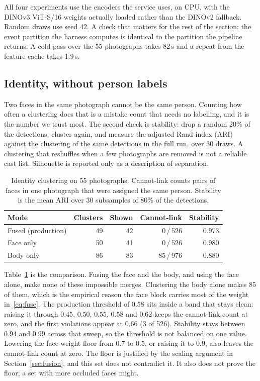 \documentclass[conference]{IEEEtran}
\begin{document}
All four experiments use the encoders the service uses, on CPU, with the
\mbox{DINOv3} ViT-S/16 weights actually loaded rather than the DINOv2 fallback.
Random draws use seed 42. A check that matters for the rest of the section:
the event partition the harness computes is identical to the partition the
pipeline returns. A cold pass over the 55 photographs takes 82\,s and a repeat
from the feature cache takes 1.9\,s.

\subsection{Identity, without person labels}
\label{sec:id-eval}

Two faces in the same photograph cannot be the same person. Counting how often
a clustering does that is a mistake count that needs no labelling, and it is
the number we trust most. The second check is stability: drop a random 20\% of
the detections, cluster again, and measure the adjusted Rand index
(ARI)~\cite{hubert1985comparing} against the clustering of the same detections
in the full run, over 30 draws. A clustering that reshuffles when a few
photographs are removed is not a reliable cast list. Silhouette is reported
only as a description of separation.

\begin{table}[t]
\caption{Identity clustering on 55 photographs. Cannot-link counts pairs of
faces in one photograph that were assigned the same person. Stability is the
mean ARI over 30 subsamples of 80\% of the detections.}
\label{tab:identity}
\centering
\scriptsize
\begin{tabular}{@{}lrrrr@{}}
\toprule
Mode & Clusters & Shown & Cannot-link & Stability \\
\midrule
Fused (production) & 49 & 42 & 0\,/\,526 & 0.973 \\
Face only & 50 & 41 & 0\,/\,526 & 0.980 \\
Body only & 86 & 83 & 85\,/\,976 & 0.880 \\
\bottomrule
\end{tabular}
\end{table}

Table~\ref{tab:identity} is the comparison. Fusing the face and the body, and
using the face alone, make none of these impossible merges. Clustering the
body alone makes 85 of them, which is the empirical reason the face block
carries most of the weight in~\eqref{eq:fuse}. The production threshold of
$0.58$ sits inside a band that stays clean: raising it through $0.45$, $0.50$,
$0.55$, $0.58$ and $0.62$ keeps the cannot-link count at zero, and the first
violations appear at $0.66$ (3 of 526). Stability stays between $0.94$ and
$0.99$ across that sweep, so the threshold is not balanced on one value.
Lowering the face-weight floor from $0.7$ to $0.5$, or raising it to $0.9$,
also leaves the cannot-link count at zero. The floor is justified by the
scaling argument in Section~\ref{sec:fusion}, and this set does not contradict
it. It also does not prove the floor; a set with more occluded faces might.
\end{document}
